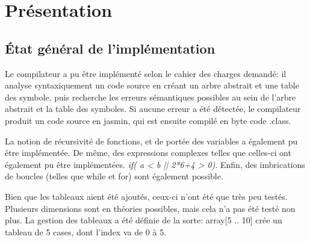 \documentclass[11pt,a4paper]{article}
\title{\vartitle}
\author{\varauthor}
\date{\vardate}
\begin{document}
  \begin{titlepage}
    \maketitle

    \thispagestyle{empty}

    \begin{abstract}
    Ce rapport décrit l'implémentation d'un compilateur du langage Hepial, défini les spécifications en annexe.
    \end{abstract}

    \vspace{1cm}

    \tableofcontents

  \end{titlepage}

  \newpage

  \section{Présentation}
  
  \subsection{État général de l'implémentation}  
  
    \par Le compilateur a pu être implémenté selon le cahier des charges demandé: il analyse syntaxiquement un code source en créant un arbre abstrait et une table des symbole, puis recherche les erreurs sémantiques possibles au sein de l'arbre abstrait et la table des symboles. Si aucune erreur a été détectée, le compilateur produit un code source en jasmin, qui est ensuite compilé en byte code .class. 
    
     \par La notion de récursivité de fonctions, et de portée des variables a également pu être implémentée. De même, des expressions complexes telles que celles-ci ont également pu être implémentées. \textit{if( a < b || 2*6+4 > 0)}. Enfin, des imbrications de boucles (telles que while et for) sont également possible. 
     
     \par Bien que les tableaux aient été ajoutés, ceux-ci n'ont été que très peu testés. Plusieurs dimensions sont en théories possibles, mais cela n'a pas été testé non plus. La gestion des tableaux a été définie de la sorte: array[5 .. 10] crée un tableau de 5 cases, dont l'index va de 0 à 5. 
     
\end{document}
